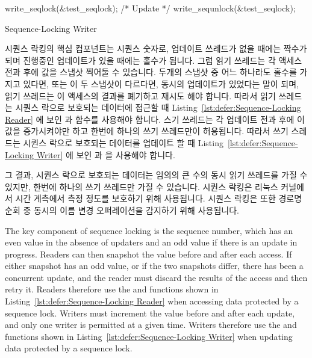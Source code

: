 \begin{listing}[bp]
\begin{VerbatimL}
write_seqlock(&test_seqlock);
/* Update */
write_sequnlock(&test_seqlock);
\end{VerbatimL}
\caption{Sequence-Locking Writer}
\label{lst:defer:Sequence-Locking Writer}
\end{listing}

시퀀스 락킹의 핵심 컴포넌트는 시퀀스 숫자로, 업데이트 쓰레드가 없을 때에는
짝수가 되며 진행중인 업데이트가 있을 때에는 홀수가 됩니다.
그럼 읽기 쓰레드는 각 액세스 전과 후에 값을 스냅샷 찍어둘 수 있습니다.
두개의 스냅샷 중 어느 하나라도 홀수를 가지고 있다면, 또는 이 두 스냅샷이
다르다면, 동시의 업데이트가 있었다는 말이 되며, 읽기 쓰레드는 이 액세스의
결과를 폐기하고 재시도 해야 합니다.
따라서 읽기 쓰레드는 시퀀스 락으로 보호되는 데이터에 접근할 때
Listing~\ref{lst:defer:Sequence-Locking Reader} 에 보인  과
 함수를 사용해야 합니다.
스기 쓰레드는 각 업데이트 전과 후에 이 값을 증가시켜야만 하고 한번에 하나의
쓰기 쓰레드만이 허용됩니다.
따라서 쓰기 스레드는 시퀀스 락으로 보호되는 데이터를 업데이트 할 때
Listing~\ref{lst:defer:Sequence-Locking Writer} 에 보인  과
 을 사용해야 합니다.

그 결과, 시퀀스 락으로 보호되는 데이터는 임의의 큰 수의 동시 읽기 쓰레드를 가질
수 있지만, 한번에 하나의 쓰기 쓰레드만 가질 수 있습니다.
시퀀스 락킹은 리눅스 커널에서 시간 계측에서 측정 정도를 보호하기 위해
사용됩니다.
시퀀스 락킹은 또한 경로명 순회 중 동시의 이름 변경 오퍼레이션을 감지하기 위해
사용됩니다.

\iffalse

The key component of sequence locking is the sequence number, which has
an even value in the absence of updaters and an odd value if there
is an update in progress.
Readers can then snapshot the value before and after each access.
If either snapshot has an odd value, or if the two snapshots differ,
there has been a concurrent update, and the reader must discard
the results of the access and then retry it.
Readers therefore use the  and 
functions shown in Listing~\ref{lst:defer:Sequence-Locking Reader}
when accessing data protected by a sequence lock.
Writers must increment the value before and after each update,
and only one writer is permitted at a given time.
Writers therefore use the  and 
functions shown in Listing~\ref{lst:defer:Sequence-Locking Writer}
when updating data protected by a sequence lock.

